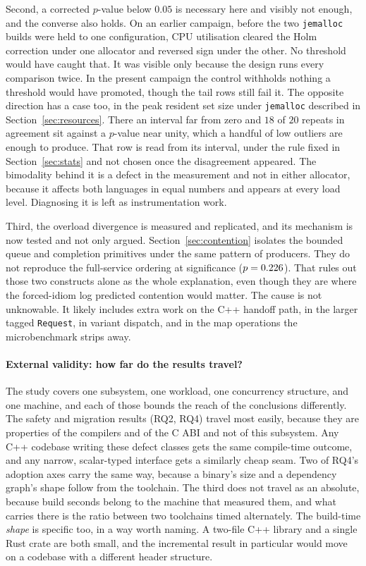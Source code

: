 \documentclass[english,oneside,a4paper,censored,csm,software-track-2020]{HYthesisML}
\begin{document}
Second, a corrected $p$-value below $0.05$ is necessary here and visibly not enough, and the
converse also holds. On an earlier campaign, before the two \texttt{jemalloc} builds were held to
one configuration, CPU utilisation cleared the Holm correction under one allocator and reversed
sign under the other. No threshold would have caught that. It was visible only because the
design runs every comparison twice. In the present campaign the control withholds nothing a
threshold would have promoted, though the tail rows still fail it. The opposite direction has a case
too, in the peak resident set size under \texttt{jemalloc} described in
Section~\ref{sec:resources}. There an interval far from zero and $18$ of $20$ repeats in agreement
sit against a $p$-value near unity, which a handful of low outliers are enough to produce. That row is
read from its interval, under the rule fixed in Section~\ref{sec:stats} and not chosen once the
disagreement appeared. The bimodality behind it is a defect in the measurement and not in
either allocator, because it affects both languages in equal numbers and appears at every load
level. Diagnosing it is left as instrumentation work.

Third, the overload divergence is measured and replicated, and its mechanism is now tested and
not only argued. Section~\ref{sec:contention} isolates the bounded queue and completion
primitives under the same pattern of \ContentionProducers{} producers. They do not reproduce the full-service ordering
at significance ($p = 0.226$). That rules out those two constructs alone as the whole
explanation, even though they are where the forced-idiom log predicted contention would matter. The
cause is not unknowable. It likely includes extra work on the C++ handoff path, in the larger
tagged \texttt{Request}, in variant dispatch, and in the map operations the microbenchmark strips
away.

\paragraph{External validity: how far do the results travel?}
The study covers one subsystem, one workload, one concurrency structure, and one machine, and
each of those bounds the reach of the conclusions differently. The safety and migration
results (RQ2, RQ4) travel most easily, because they are properties of the compilers and
of the C ABI and not of this subsystem. Any C++ codebase writing these defect classes gets
the same compile-time outcome, and any narrow, scalar-typed interface gets a similarly cheap
seam. Two of RQ4's adoption axes carry the same way, because a binary's size and a dependency
graph's shape follow from the toolchain. The third does not travel as an absolute, because
build seconds belong to the machine that measured them, and what carries there is the ratio
between two toolchains timed alternately. The build-time \emph{shape} is specific too, in a way
worth naming. A two-file C++ library and a single Rust crate are both small, and the incremental
result in particular would move on a codebase with a different header structure.
\end{document}
